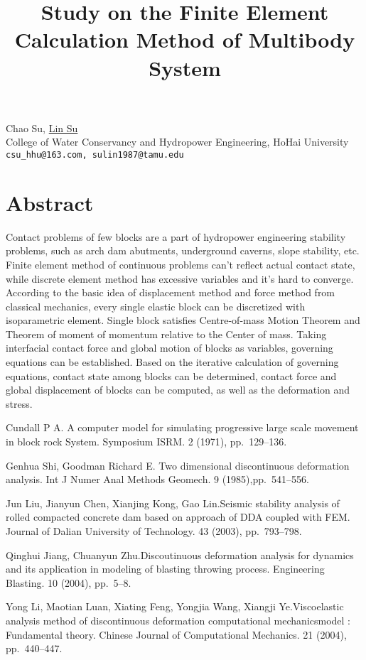 \title{Study on the Finite Element Calculation Method of Multibody System}
\author{} \institute{}
\maketitle

\begin{center}
{\large Chao Su, \underline{Lin Su}}\\
College of Water Conservancy and Hydropower Engineering, HoHai University\\
{\tt csu\_hhu@163.com, sulin1987@tamu.edu}
\end{center}

\section*{Abstract}
Contact problems of few blocks are a part of hydropower engineering stability problems, such as arch dam abutments, underground caverns, slope stability, etc. Finite element method of continuous problems can't reflect actual contact state, while discrete element method has excessive variables and it's hard to converge. According to the basic idea of displacement method and force method from classical mechanics, every single elastic block can be discretized with isoparametric element. Single block satisfies Centre-of-mass Motion Theorem and Theorem of moment of momentum relative to the Center of mass. Taking interfacial contact force and global motion of blocks as variables, governing equations can be established. Based on the iterative calculation of governing equations, contact state among blocks can be determined, contact force and global displacement of blocks can be computed, as well as the deformation and stress.


\begin{thebibliography}{10}
{\sc Cundall P A}. {A computer model for simulating progressive large scale movement in block rock System}. Symposium ISRM. 2 (1971), pp.~129--136.
	
{\sc Genhua Shi, Goodman Richard E}. {Two dimensional discontinuous deformation analysis}. Int J Numer Anal Methods Geomech. 9 (1985),pp.~541--556.

{\sc Jun Liu, Jianyun Chen, Xianjing Kong, Gao Lin}.{Seismic stability analysis of rolled compacted concrete dam based on approach of DDA coupled with FEM}. Journal of Dalian University of Technology. 43 (2003), pp.~793--798.

{\sc Qinghui Jiang, Chuanyun Zhu}.{Discoutinuous deformation analysis for dynamics and its application in modeling of blasting throwing process}. Engineering Blasting. 10 (2004), pp.~5--8.

{\sc Yong Li, Maotian Luan, Xiating Feng, Yongjia Wang, Xiangji Ye}.{Viscoelastic analysis method of discontinuous deformation computational mechanicsmodel : Fundamental theory}. Chinese Journal of Computational Mechanics. 21 (2004), pp.~440--447.
\end{thebibliography}
